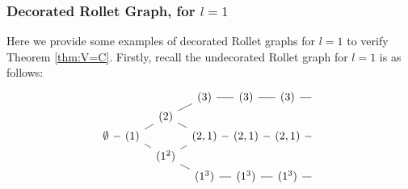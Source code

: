 \subsubsection{Decorated Rollet Graph, for $l=1$} \label{ss:DRG1}
Here we provide some examples of decorated Rollet graphs for $l=1$ to verify Theorem \ref{thm:V=C}. Firstly, recall the undecorated Rollet graph for $l=1$ is as follows:
\[
\begin{tikzcd}[column sep=0.6em,row sep=0em]
&&&(3)\ar[dash,r]&(3)\ar[dash,r]&(3)\ar[dash,r]&{}\\
&&(2)\arrow[dash,ur]\arrow[dash,dr]\\
\emptyset\arrow[dash,r] & (1)\arrow[dash,ur]\arrow[dash,dr] &&(2,1)\ar[dash,r]&(2,1)\ar[dash,r]&(2,1)\ar[dash,r]&{}\\
&&(1^2)\arrow[dash,ur]\arrow[dash,dr]\\
&&&(1^3)\ar[dash,r]&(1^3)\ar[dash,r]&(1^3)\ar[dash,r]&{}
\end{tikzcd}
\]
